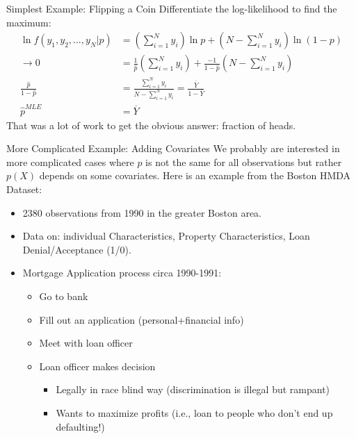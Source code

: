 \documentclass[aspectratio=169,11pt]{beamer}
\begin{document}
\begin{frame}{Simplest Example: Flipping a Coin}
Differentiate the log-likelihood to find the maximum:
\begin{align*}
\ln  f(y_1,y_2,\ldots,y_N | p )  &= \left( \sum_{i=1}^N y_i \right)  \ln p  + \left(N-\sum_{i=1}^N y_i \right)  \ln(1-p)\\
\rightarrow 0&= \frac{1}{\hat{p}}  \left( \sum_{i=1}^N y_i \right) + \frac{-1}{1-\hat{p}}   \left(N-\sum_{i=1}^N y_i \right) \\
 \frac{\hat{p}}{1-\hat{p}} &= \frac{\sum_{i=1}^N y_i }{N- \sum_{i=1}^N y_i } = \frac{\overline{Y}}{1-\overline{Y}} \\
\hat{p}^{MLE} &= \overline{Y}
\end{align*}
That was a lot of work to get the obvious answer: \alert{fraction of heads}.
\end{frame}

\begin{frame}{More Complicated Example: Adding Covariates}
We probably are interested in more complicated cases where $p$ is not the same for all observations but rather $p(X)$ depends on some covariates. Here is an example from the Boston HMDA Dataset:
\begin{itemize}
\item 2380 observations from 1990 in the greater Boston area.
\item Data on: individual Characteristics, Property Characteristics, Loan Denial/Acceptance (1/0).
\item Mortgage Application process circa 1990-1991:
\begin{itemize}
\item Go to bank
\item Fill out an application (personal+financial info)
\item Meet with loan officer
\item Loan officer makes decision
\begin{itemize}
\item Legally in race blind way (discrimination is illegal but rampant)
\item Wants to maximize profits (i.e., loan to people who don't end up defaulting!)
\end{itemize}
\end{itemize}
\end{itemize}
\end{frame}
\end{document}
